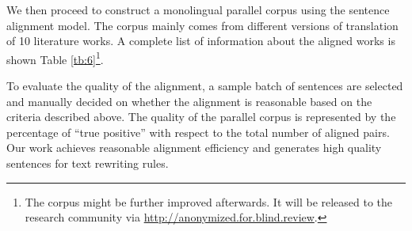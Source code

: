 We then proceed to construct a monolingual parallel corpus using the sentence alignment model. The corpus mainly comes from different versions of translation of 10 literature works. A complete list of information about the aligned works is shown Table \ref{tb:6}\footnote{The corpus might be further improved afterwards. It will be released to the research community via \url{http://anonymized.for.blind.review}.}.

To evaluate the quality of the alignment, a sample batch of sentences are selected and manually decided on whether the alignment is reasonable based on the criteria described above. The quality of the parallel corpus is represented by the percentage of ``true positive'' with respect to the total number of aligned pairs. Our work achieves reasonable alignment efficiency and generates high quality sentences for text rewriting rules.

